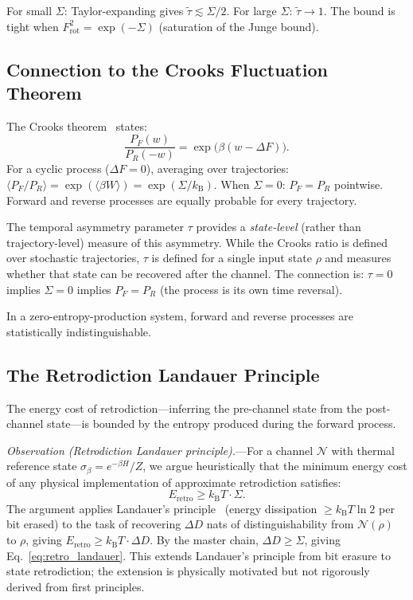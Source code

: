 \documentclass[prl,twocolumn,superscriptaddress,longbibliography]{revtex4-2}
\newcommand{\kB}{k_{\mathrm{B}}}
\newcommand{\chan}{\mathcal{N}}
\newcommand{\tauasym}{\tau}
\newcommand{\taurot}{\tilde{\tau}}
\begin{document}
For small $\Sigma$: Taylor-expanding gives $\taurot \lesssim \Sigma/2$.
For large $\Sigma$: $\taurot \to 1$. The bound is tight when
$F_{\mathrm{rot}}^2 = \exp(-\Sigma)$ (saturation of the Junge bound).

\subsection{Connection to the Crooks Fluctuation Theorem}

The Crooks theorem~\cite{Crooks1999} states:
\begin{equation}
\frac{P_F(w)}{P_R(-w)} = \exp\!\big(\beta(w - \Delta F)\big).
\end{equation}
For a cyclic process ($\Delta F = 0$), averaging over trajectories:
$\langle P_F/P_R \rangle = \exp(\langle \beta W \rangle) =
\exp(\Sigma/\kB)$. When $\Sigma = 0$: $P_F = P_R$ pointwise.
Forward and reverse processes are equally probable for every
trajectory.

The temporal asymmetry parameter $\tauasym$ provides a
\emph{state-level} (rather than trajectory-level) measure of this
asymmetry. While the Crooks ratio is defined over stochastic
trajectories, $\tauasym$ is defined for a single input state $\rho$
and measures whether that state can be recovered after the channel.
The connection is: $\tauasym = 0$ implies $\Sigma = 0$ implies
$P_F = P_R$ (the process is its own time reversal).

In a zero-entropy-production system, forward and reverse processes
are statistically indistinguishable.

\subsection{The Retrodiction Landauer Principle}

The energy cost of retrodiction---inferring the pre-channel state
from the post-channel state---is bounded by the entropy produced
during the forward process.

\emph{Observation (Retrodiction Landauer principle).}---For a
channel $\chan$ with thermal reference state
$\sigma_\beta = e^{-\beta H}/Z$, we argue heuristically that the
minimum energy cost of any physical implementation of approximate
retrodiction satisfies:
\begin{equation}
E_{\mathrm{retro}} \geq \kB T \cdot \Sigma.
\label{eq:retro_landauer}
\end{equation}
The argument applies Landauer's principle~\cite{ReebWolf2014}
(energy dissipation $\geq \kB T \ln 2$ per bit erased) to the
task of recovering $\Delta D$ nats of distinguishability from
$\chan(\rho)$ to $\rho$, giving
$E_{\mathrm{retro}} \geq \kB T \cdot \Delta D$.
By the master chain, $\Delta D \geq \Sigma$, giving
Eq.~\eqref{eq:retro_landauer}.
This extends Landauer's principle from bit erasure to state
retrodiction; the extension is physically motivated but not
rigorously derived from first principles.
\end{document}
